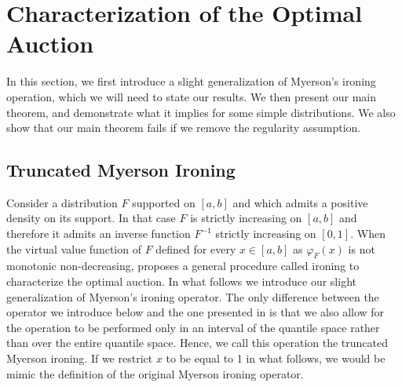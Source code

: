 \section{Characterization of the Optimal Auction}\label{sec:optimal_auction}

In this section, we first introduce a slight generalization of Myerson's ironing operation, which we will need to state our results. We then present our main theorem, and demonstrate what it implies for some simple distributions. We also show that our main theorem fails if we remove the regularity assumption. 

\subsection{Truncated Myerson Ironing}\label{sec:ironing}

Consider a distribution $F$ supported on $[a,b]$ and which admits a positive density on its support.  In that case $F$ is strictly increasing on $[a,b]$ and therefore it admits an inverse function $F^{-1}$ strictly increasing on $[0,1]$. When the virtual value function of $F$ defined for every $x \in [a,b]$ as $\varphi_{F}(x)$  
is not monotonic non-decreasing, \citet{myerson1981optimal} proposes a general procedure called ironing to characterize the optimal auction. In what follows we introduce our slight generalization of Myerson's ironing operator. The only difference between the operator we introduce below and the one presented in \citet{myerson1981optimal} is that we also allow for the operation to be performed only in an interval of the quantile space rather than over the entire quantile space. Hence, we call this operation the truncated Myerson ironing. If we restrict $x$ to be equal to 1 in what follows, we would be mimic the definition of the original Myerson ironing operator.



